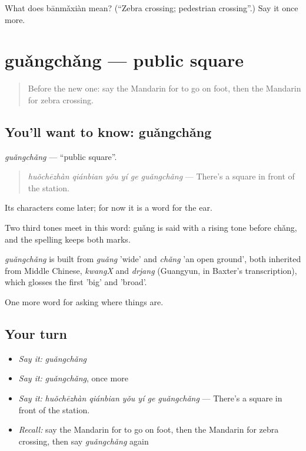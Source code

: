 \begin{tcolorbox}[breakable,colback=teal!4,colframe=teal!35!black,title={Before you move on}]
What does bānmǎxiàn mean? (\textquotedblleft{}Zebra crossing; pedestrian crossing\textquotedblright{}.) Say it once more.
\end{tcolorbox}
\section[guǎngchǎng]{guǎngchǎng — public square}

\label{lesson:ZH-C194-guangchang}



\begin{quote}
Before the new one: say the Mandarin for to go on foot, then the Mandarin for zebra crossing.
\end{quote}

\subsection*{You'll want to know: guǎngchǎng}
\emph{guǎngchǎng} — \textquotedblleft{}public square\textquotedblright{}.

\begin{quote}
\emph{huǒchēzhàn qiánbian yǒu yí ge guǎngchǎng} — There's a square in front of the station.
\end{quote}

Its characters come later; for now it is a word for the ear.

Two third tones meet in this word: guǎng is said with a rising tone before chǎng, and the spelling keeps both marks.

\begin{cousinweb}
\emph{guǎngchǎng} is built from \emph{guǎng} 'wide' and \emph{chǎng} 'an open ground', both inherited from Middle Chinese, \emph{kwangX} and \emph{drjang} (Guangyun, in Baxter's transcription), which glosses the first 'big' and 'broad'.
\end{cousinweb}

\begin{grammarlens}[title={What you've built}]
One more word for asking where things are.
\end{grammarlens}

\subsection*{Your turn}
\begin{itemize}
\raggedright
  \item \emph{Say it:} \emph{guǎngchǎng}
  \item \emph{Say it:} \emph{guǎngchǎng}, once more
  \item \emph{Say it:} \emph{huǒchēzhàn qiánbian yǒu yí ge guǎngchǎng} — There's a square in front of the station.
  \item \emph{Recall:} say the Mandarin for to go on foot, then the Mandarin for zebra crossing, then say \emph{guǎngchǎng} again
\end{itemize}

